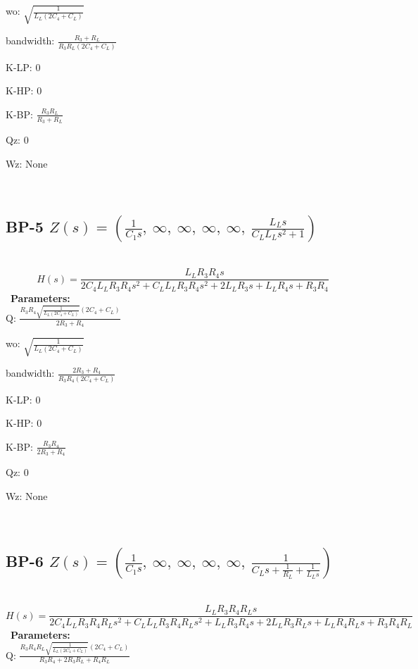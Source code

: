 \documentclass{article}
\begin{document}
wo: $\sqrt{\frac{1}{L_{L} \left(2 C_{4} + C_{L}\right)}}$\ 

bandwidth: $\frac{R_{3} + R_{L}}{R_{3} R_{L} \left(2 C_{4} + C_{L}\right)}$\ 

K-LP: $0$\ 

K-HP: $0$\ 

K-BP: $\frac{R_{3} R_{L}}{R_{3} + R_{L}}$\ 

Qz: $0$\ 

Wz: $\text{None}$\ 

\ 

\subsection{BP-5 $Z(s) = \left( \frac{1}{C_{1} s}, \  \infty, \  \infty, \  \infty, \  \infty, \  \frac{L_{L} s}{C_{L} L_{L} s^{2} + 1}\right)$ } \ 
\textbf{\[H(s) = \frac{L_{L} R_{3} R_{4} s}{2 C_{4} L_{L} R_{3} R_{4} s^{2} + C_{L} L_{L} R_{3} R_{4} s^{2} + 2 L_{L} R_{3} s + L_{L} R_{4} s + R_{3} R_{4}}\] } \ 
\textbf{Parameters:}\\ 

Q: $\frac{R_{3} R_{4} \sqrt{\frac{1}{L_{L} \left(2 C_{4} + C_{L}\right)}} \left(2 C_{4} + C_{L}\right)}{2 R_{3} + R_{4}}$\ 

wo: $\sqrt{\frac{1}{L_{L} \left(2 C_{4} + C_{L}\right)}}$\ 

bandwidth: $\frac{2 R_{3} + R_{4}}{R_{3} R_{4} \left(2 C_{4} + C_{L}\right)}$\ 

K-LP: $0$\ 

K-HP: $0$\ 

K-BP: $\frac{R_{3} R_{4}}{2 R_{3} + R_{4}}$\ 

Qz: $0$\ 

Wz: $\text{None}$\ 

\ 

\subsection{BP-6 $Z(s) = \left( \frac{1}{C_{1} s}, \  \infty, \  \infty, \  \infty, \  \infty, \  \frac{1}{C_{L} s + \frac{1}{R_{L}} + \frac{1}{L_{L} s}}\right)$ } \ 
\textbf{\[H(s) = \frac{L_{L} R_{3} R_{4} R_{L} s}{2 C_{4} L_{L} R_{3} R_{4} R_{L} s^{2} + C_{L} L_{L} R_{3} R_{4} R_{L} s^{2} + L_{L} R_{3} R_{4} s + 2 L_{L} R_{3} R_{L} s + L_{L} R_{4} R_{L} s + R_{3} R_{4} R_{L}}\] } \ 
\textbf{Parameters:}\\ 

Q: $\frac{R_{3} R_{4} R_{L} \sqrt{\frac{1}{L_{L} \left(2 C_{4} + C_{L}\right)}} \left(2 C_{4} + C_{L}\right)}{R_{3} R_{4} + 2 R_{3} R_{L} + R_{4} R_{L}}$\ 
\end{document}
